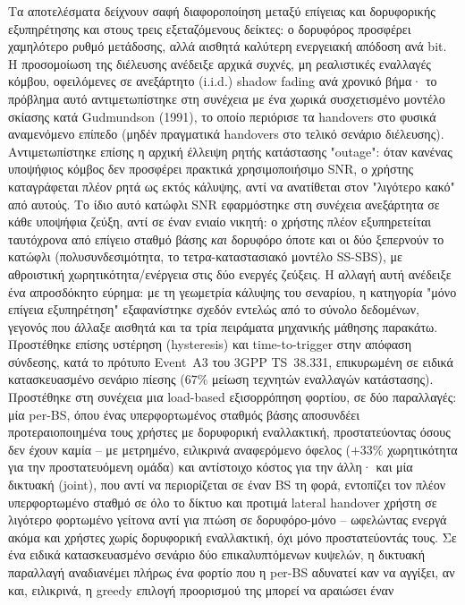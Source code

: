 Τα αποτελέσματα δείχνουν σαφή διαφοροποίηση μεταξύ επίγειας και
δορυφορικής εξυπηρέτησης και στους τρεις εξεταζόμενους δείκτες: ο
δορυφόρος προσφέρει χαμηλότερο ρυθμό μετάδοσης, αλλά αισθητά καλύτερη
ενεργειακή απόδοση ανά bit. Η προσομοίωση της διέλευσης ανέδειξε αρχικά
συχνές, μη ρεαλιστικές εναλλαγές κόμβου, οφειλόμενες σε ανεξάρτητο
(i.i.d.) shadow fading ανά χρονικό βήμα· το πρόβλημα αυτό αντιμετωπίστηκε
στη συνέχεια με ένα χωρικά συσχετισμένο μοντέλο σκίασης κατά
Gudmundson (1991), το οποίο περιόρισε τα handovers στο φυσικά αναμενόμενο
επίπεδο (μηδέν πραγματικά handovers στο τελικό σενάριο διέλευσης).
Αντιμετωπίστηκε επίσης η αρχική έλλειψη ρητής κατάστασης "outage": όταν
κανένας υποψήφιος κόμβος δεν προσφέρει πρακτικά χρησιμοποιήσιμο SNR, ο
χρήστης καταγράφεται πλέον ρητά ως εκτός κάλυψης, αντί να ανατίθεται
στον "λιγότερο κακό" από αυτούς. Το ίδιο αυτό κατώφλι SNR εφαρμόστηκε
στη συνέχεια ανεξάρτητα σε κάθε υποψήφια ζεύξη, αντί σε έναν ενιαίο
νικητή: ο χρήστης πλέον εξυπηρετείται ταυτόχρονα από επίγειο σταθμό
βάσης \emph{και} δορυφόρο όποτε και οι δύο ξεπερνούν το κατώφλι
(πολυσυνδεσιμότητα, το τετρα-καταστασιακό μοντέλο SS-SBS), με αθροιστική
χωρητικότητα/ενέργεια στις δύο ενεργές ζεύξεις. Η αλλαγή αυτή ανέδειξε
ένα απροσδόκητο εύρημα: με τη γεωμετρία κάλυψης του σεναρίου, η
κατηγορία "μόνο επίγεια εξυπηρέτηση" εξαφανίστηκε σχεδόν εντελώς από το
σύνολο δεδομένων, γεγονός που άλλαξε αισθητά και τα τρία πειράματα
μηχανικής μάθησης παρακάτω. Προστέθηκε επίσης υστέρηση (hysteresis) και
time-to-trigger στην απόφαση σύνδεσης, κατά το πρότυπο Event~A3 του
3GPP TS~38.331, επικυρωμένη σε ειδικά κατασκευασμένο σενάριο πίεσης
($67\%$ μείωση τεχνητών εναλλαγών κατάστασης). Προστέθηκε στη συνέχεια μια
load-based εξισορρόπηση φορτίου, σε δύο παραλλαγές: μία per-BS, όπου
ένας υπερφορτωμένος σταθμός βάσης αποσυνδέει προτεραιοποιημένα τους
χρήστες με δορυφορική εναλλακτική, προστατεύοντας όσους δεν έχουν καμία
-- με μετρημένο, ειλικρινά αναφερόμενο όφελος ($+33\%$ χωρητικότητα για
την προστατευόμενη ομάδα) και αντίστοιχο κόστος για την άλλη· και μία
δικτυακή (joint), που αντί να περιορίζεται σε έναν BS τη φορά, εντοπίζει
τον πλέον υπερφορτωμένο σταθμό σε όλο το δίκτυο και προτιμά lateral
handover χρήστη σε λιγότερο φορτωμένο γείτονα αντί για πτώση σε
δορυφόρο-μόνο -- ωφελώντας ενεργά ακόμα και χρήστες χωρίς δορυφορική
εναλλακτική, όχι μόνο προστατεύοντάς τους. Σε ένα ειδικά κατασκευασμένο
σενάριο δύο επικαλυπτόμενων κυψελών, η δικτυακή παραλλαγή αναδιανέμει
πλήρως ένα φορτίο που η per-BS αδυνατεί καν να αγγίξει, αν και,
ειλικρινά, η greedy επιλογή προορισμού της μπορεί να αραιώσει έναν
